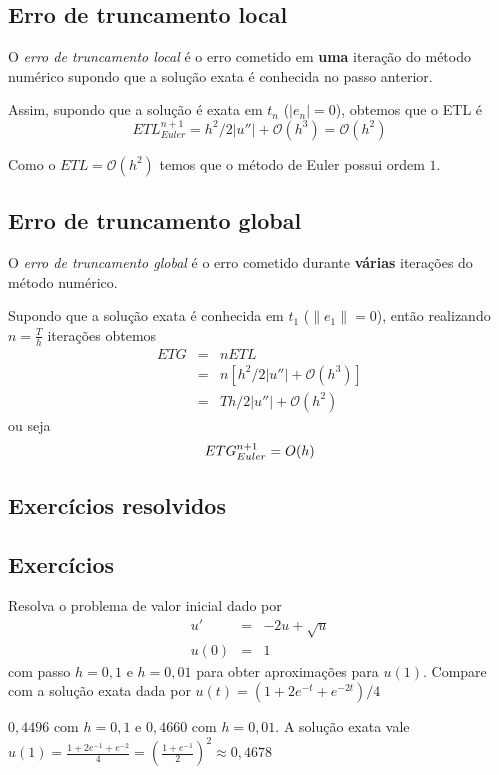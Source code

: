 \subsection{Erro de truncamento local}

O \emph{erro de truncamento local} é o erro cometido em \textbf{uma} iteração do método numérico supondo que a solução exata é conhecida no passo anterior.

Assim, supondo que a solução é exata em $t_n$ ($|e_n|=0$), obtemos que o ETL é
$$ETL_{Euler}^{n+1}= h^2/2|u''|+ \mathcal O(h^3) = \mathcal O(h^2)$$

Como o $ETL=\mathcal O(h^2)$ temos que o método de Euler possui ordem $1$.


\subsection{Erro de truncamento global}
O \emph{erro de truncamento global} é o erro cometido durante \textbf{várias} iterações do método numérico.

Supondo que a solução exata é conhecida em $t_1$ ($\|e_1\|=0$), então realizando $n=\frac{T}{h}$ iterações obtemos
\begin{eqnarray}
   ETG &=& nETL \\
       &=& n[h^2/2|u''|+ \mathcal O(h^3)] \\
       &=& Th/2|u''|+ \mathcal O(h^2)
\end{eqnarray}
ou seja
$$ETG_{Euler}^{n+1} = \mathcal \mathcal{O}(h)$$

\subsection*{Exercícios resolvidos}

\emconstrucao

\subsection*{Exercícios}
\begin{exer}Resolva o problema de valor inicial dado por
\begin{eqnarray*}
u'&=& -2u + \sqrt{u}\\
u(0)&=&1
\end{eqnarray*}
com passo $h=0,1$ e $h=0,01$ para obter aproximações para $u(1)$. Compare com a solução exata dada por $u(t) =  \left({1+2 e^{-t}+e^{-2 t}}\right)/{4}$
\end{exer}
\begin{resp}

 $0,4496$ com $h=0,1$ e $0,4660$ com $h=0,01$. A solução exata vale $u(1)=\frac{1+2e^{-1}+e^{-2}}{4}= \left(\frac{1+e^{-1}}{2}\right)^2\approx 0,4678$

\end{resp}


